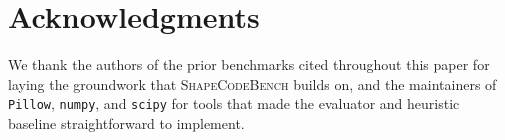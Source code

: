 \section*{Acknowledgments}

We thank the authors of the prior benchmarks cited throughout this paper for
laying the groundwork that \textsc{ShapeCodeBench} builds on, and the maintainers of
\texttt{Pillow}, \texttt{numpy}, and \texttt{scipy} for tools that made the
evaluator and heuristic baseline straightforward to implement.
